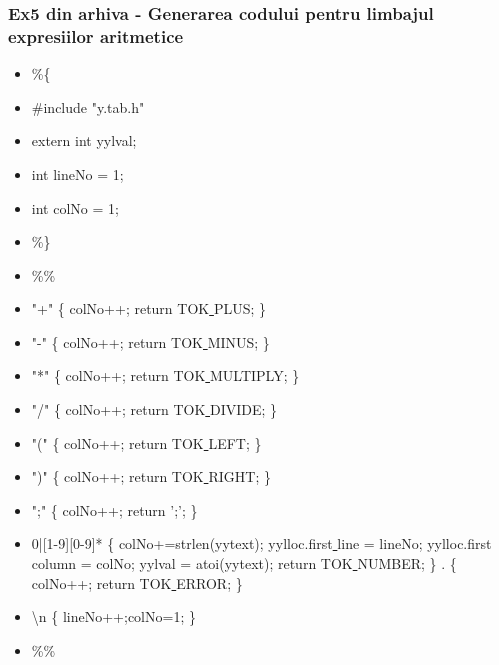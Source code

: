 \documentclass[pdf]{beamer}
\begin{document}
\begin{frame}[shrink=10]
\frametitle{Ex5 din arhiva - Generarea codului pentru limbajul expresiilor aritmetice}
\begin{itemize}
\item
\%\{
\item \quad
	\#include "y.tab.h"
\item \quad
	extern int yylval;
\item \quad
	int lineNo = 1; 
\item \quad
     int colNo = 1;
\item
\%\}
\item
\%\%
\item
"+" \qquad	\{ colNo++; return TOK\underline{ }PLUS; \}
\item
"-"	\qquad \hspace{0.8mm}	\{ colNo++; return TOK\underline{ }MINUS; \}
\item
"*"	\qquad \hspace{0.3mm}	\{ colNo++; return TOK\underline{ }MULTIPLY; \}
\item
"/"	\qquad \hspace{0.3mm}	\{ colNo++; return TOK\underline{ }DIVIDE; \}
\item
"("	\qquad \hspace{0.5mm}	\{ colNo++; return TOK\underline{ }LEFT; \}
\item
")"	\qquad \hspace{0.5mm}	\{ colNo++; return TOK\underline{ }RIGHT; \}
\item
";"	\qquad \hspace{1mm}	\{ colNo++; return ';'; \}
\item
0|[1-9][0-9]* \qquad	\{ colNo+=strlen(yytext); yylloc.first\underline{ }line = lineNo; yylloc.first\underline{ }column = colNo; yylval = atoi(yytext); return TOK\underline{ }NUMBER; \}
.		\{ colNo++; return TOK\underline{ }ERROR; \}
\item
\textbackslash{n} \hspace{2mm}	\qquad	\{ lineNo++;colNo=1; \}
\item
\%\%
\end{itemize}
\end{frame}
\end{document}
